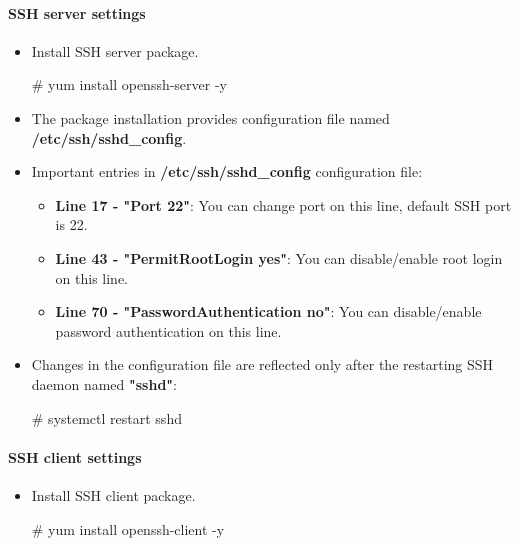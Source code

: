 \setlength{\columnsep}{3pt}
\begin{flushleft}

\bigskip
\paragraph{SSH server settings}
\begin{itemize}
	\item Install SSH server package.
	\bigskip
	\begin{tcolorbox}[breakable,notitle,boxrule=-0pt,colback=black,colframe=black]
		\color{green}
		\font=9pt
		\# yum install openssh-server -y
		\font=4pt
	\end{tcolorbox}
	\bigskip
	\item The package installation provides configuration file named \textbf{/etc/ssh/sshd\_config}.
	\bigskip
	\item Important entries in \textbf{/etc/ssh/sshd\_config} configuration file:
	\begin{itemize}
		\item \textbf{Line 17 - "Port 22"}: You can change port on this line, default SSH port is 22.
		\item \textbf{Line 43 - "PermitRootLogin yes"}: You can disable/enable root login on this line.
		\item \textbf{Line 70 - "PasswordAuthentication no"}: You can disable/enable password authentication on this line.
	\end{itemize}
	\bigskip
	\item Changes in the configuration file are reflected only after the restarting SSH daemon named \textbf{"sshd"}:
	\bigskip
	\begin{tcolorbox}[breakable,notitle,boxrule=-0pt,colback=black,colframe=black]
		\color{green}
		\font=9pt
		\# systemctl restart sshd
		\font=4pt
	\end{tcolorbox}
\end{itemize}

\bigskip

\paragraph{SSH client settings}
\begin{itemize}
	\item Install SSH client package.
	\bigskip
	\begin{tcolorbox}[breakable,notitle,boxrule=-0pt,colback=black,colframe=black]
		\color{green}
		\font=9pt
		\# yum install openssh-client -y
		\font=4pt
	\end{tcolorbox}
\end{itemize}


\end{flushleft}
\newpage


